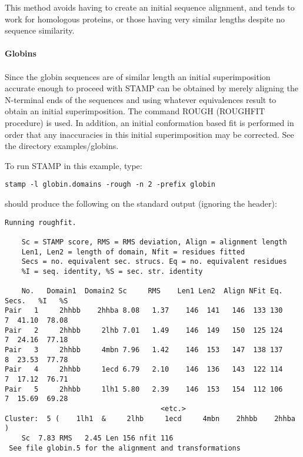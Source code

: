This method avoids having to create an initial sequence alignment, and 
tends to work for homologous proteins, or those having very similar 
lengths despite no sequence similarity.\\
\\
{\bf Globins}\\
\\
Since the globin sequences are of similar length an initial
superimposition accurate enough to proceed with STAMP can be
obtained by merely aligning the N-terminal ends of the sequences
and using whatever equivalences result to obtain an initial 
superimposition.  The command ROUGH (ROUGHFIT procedure) is used.  In addition,
an initial conformation based fit is performed 
in order that any inaccuracies in this initial superimposition may be corrected.  
See the directory examples/globins.

To run STAMP in this example, type:

\begin{scriptsize}\begin{verbatim}
stamp -l globin.domains -rough -n 2 -prefix globin 
\end{verbatim} \end{scriptsize}

should produce the following on the standard output (ignoring the header):\\

\begin{scriptsize}\begin{verbatim}
Running roughfit.

    Sc = STAMP score, RMS = RMS deviation, Align = alignment length
    Len1, Len2 = length of domain, Nfit = residues fitted
    Secs = no. equivalent sec. strucs. Eq = no. equivalent residues
    %I = seq. identity, %S = sec. str. identity

    No.   Domain1  Domain2 Sc     RMS    Len1 Len2  Align NFit Eq. Secs.   %I   %S 
Pair   1     2hhbb    2hhba 8.08   1.37    146  141   146  133 130    7  41.10  78.08
Pair   2     2hhbb     2lhb 7.01   1.49    146  149   150  125 124    7  24.16  77.18
Pair   3     2hhbb     4mbn 7.96   1.42    146  153   147  138 137    8  23.53  77.78
Pair   4     2hhbb     1ecd 6.79   2.10    146  136   143  122 114    7  17.12  76.71
Pair   5     2hhbb     1lh1 5.80   2.39    146  153   154  112 106    7  15.69  69.28
                                     <etc.>
Cluster:  5 (    1lh1  &     2lhb     1ecd     4mbn    2hhbb    2hhba ) 
	Sc  7.83 RMS   2.45 Len 156 nfit 116 
 See file globin.5 for the alignment and transformations
\end{verbatim} \end{scriptsize}


